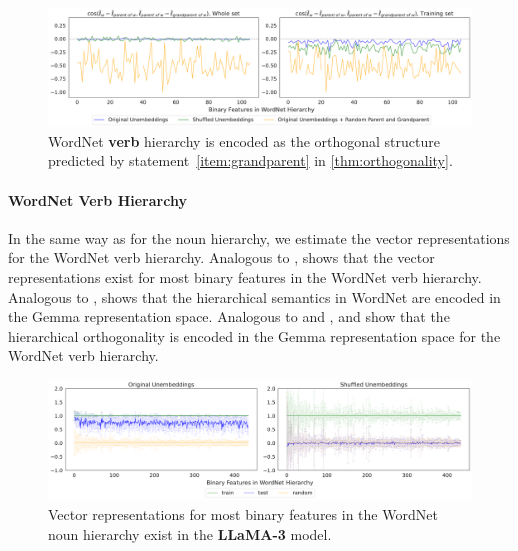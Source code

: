 \documentclass{article}
\begin{document}
\begin{figure}[t]
  \centering
  \includegraphics[width=1.0\linewidth]{figures/hier_ortho_e_verb_gemma.pdf}
  \caption{WordNet \textbf{verb} hierarchy is encoded as the orthogonal structure predicted by statement~\ref{item:grandparent} in \cref{thm:orthogonality}.
  }
  \label{fig:hier_ortho_e_verb_gemma}
\end{figure}

\paragraph*{WordNet Verb Hierarchy}
In the same way as for the noun hierarchy, we estimate the vector representations for the WordNet verb hierarchy.
Analogous to ,  shows that the vector representations exist for most binary features in the WordNet verb hierarchy.
Analogous to ,  shows that the hierarchical semantics in WordNet are encoded in the Gemma representation space.
Analogous to  and ,  and  show that the hierarchical orthogonality is encoded in the Gemma representation space for the WordNet verb hierarchy.




\begin{figure}[t]
  \centering
  \includegraphics[width=1.0\linewidth]{figures/eval_lda_noun_llama.pdf}
  \caption{Vector representations for most binary features in the WordNet noun hierarchy exist in the \textbf{LLaMA-3} model.}
  \label{fig:eval_lda_noun_llama}
\end{figure}
\end{document}

